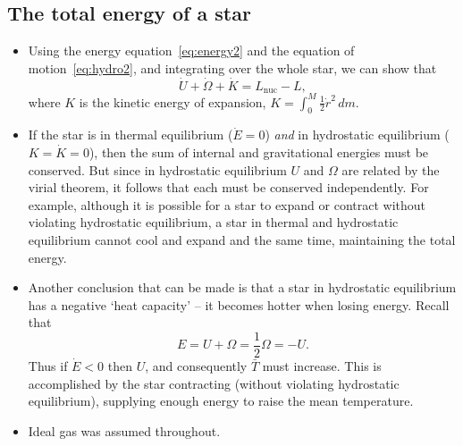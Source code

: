 \documentclass[10pt,amsmath,amssymb,aps,pra]{revtex4-2}
\begin{document}
\subsection{The total energy of a star}
\begin{itemize}
\item Using the energy equation~\eqref{eq:energy2} and the equation of
motion~\eqref{eq:hydro2}, and integrating over the whole star, we can show that
\begin{equation}\label{eq:totalenergy}
\dot{U} + \dot{\Omega} + \dot{{K}} = L_\text{nuc} - L,
\end{equation}
where $K$ is the kinetic energy of expansion,
$K = \int_0^M\frac{1}{2}\dot{r}^2\,dm$.

\item If the star is in thermal equilibrium ($\dot{E}=0$) \emph{and} in
hydrostatic equilibrium ($K=\dot{K}=0$), then the sum of internal and
gravitational energies must be conserved. But since in hydrostatic equilibrium
$U$ and $\Omega$ are related by the virial theorem, it follows that each must be
conserved independently. For example, although it is possible for a star to
expand or contract without violating hydrostatic equilibrium, a star in thermal
and hydrostatic equilibrium cannot cool and expand and the same time,
maintaining the total energy.

\item Another conclusion that can be made is that a star in hydrostatic
equilibrium has a negative `heat capacity' -- it becomes hotter when losing
energy. Recall that
\begin{equation}
E = U + \Omega = \frac{1}{2}\Omega = -U.
\end{equation}
Thus if $\dot{E}<0$ then $U$, and consequently $\bar{T}$ must increase. This is
accomplished by the star contracting (without violating hydrostatic
equilibrium), supplying enough energy to raise the mean temperature.

\item Ideal gas was assumed throughout.
\end{itemize}
\end{document}
